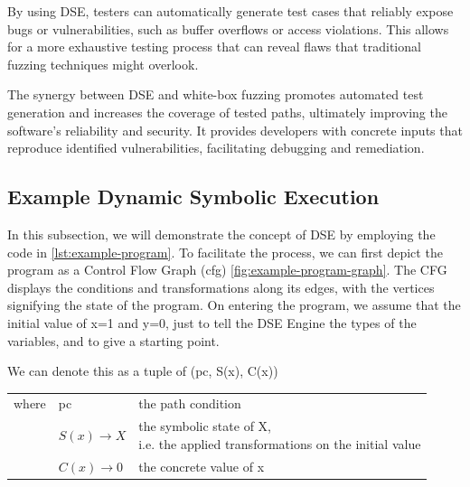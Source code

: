 By using DSE, testers can automatically generate test cases that reliably expose bugs or vulnerabilities, such as buffer overflows or access violations. This allows for a more exhaustive testing process that can reveal flaws that traditional fuzzing techniques might overlook.

The synergy between DSE and white-box fuzzing promotes automated test generation and increases the coverage of tested paths, ultimately improving the software's reliability and security. It provides developers with concrete inputs that reproduce identified vulnerabilities, facilitating debugging and remediation.



\subsection{Example Dynamic Symbolic Execution}
In this subsection, we will demonstrate the concept of DSE by employing the code in \autoref{lst:example-program}. 
To facilitate the process, we can first depict the program as a Control Flow Graph (\gls{cfg}) \autoref{fig:example-program-graph}. 
The CFG displays the conditions and transformations along its edges, with the vertices signifying the state of the program.
On entering  the program, we assume that the initial value of x=1 and y=0, just to tell the DSE Engine the types of the variables, and to give a starting point. 
\capstartfalse
\begin{center}
    We can denote this as a tuple of (pc, S(x), C(x)) 
    \begin{table}[ht]
        \begin{tabular}{lll}
            where & pc & the path condition \\
             & $S(x) \rightarrow X$& \specialcell[c]{the symbolic state of X,\\ i.e. the applied transformations on the initial value}\\
             & $C(x) \rightarrow 0$& the concrete value of x\\
        \end{tabular}
    \end{table}
\end{center} 
\capstarttrue
\vspace{0.5cm}


